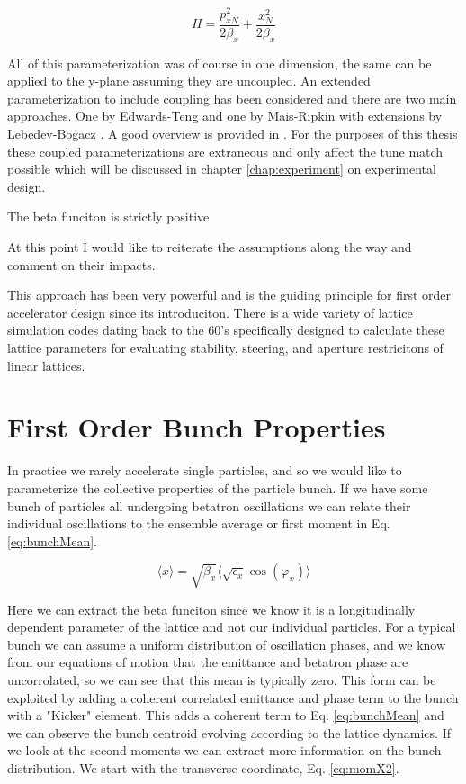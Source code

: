 \begin{equation} \label{eq:csNormHam}
	H = \frac{p_{xN}^2}{2\beta_x} + \frac{x_{N}^2}{2\beta_x}
\end{equation}

All of this parameterization was of course in one dimension, the same can be applied to the y-plane assuming they are uncoupled. An extended parameterization to include coupling has been considered and there are two main approaches. One by Edwards-Teng \cite{edwards-teng} and one by Mais-Ripkin \cite{mais-ripkin} with extensions by Lebedev-Bogacz \cite{lebedev-bogacz}. A good overview is provided in \cite{vanwelde}. For the purposes of this thesis these coupled parameterizations are extraneous and only affect the tune match possible which will be discussed in chapter \ref{chap:experiment} on experimental design.

The beta funciton is strictly positive

At this point I would like to reiterate the assumptions along the way and comment on their impacts.

This approach has been very powerful and is the guiding principle for first order accelerator design since its introduciton. There is a wide variety of lattice simulation codes dating back to the 60's specifically designed to calculate these lattice parameters for evaluating stability, steering, and aperture restricitons of linear lattices.

\section{First Order Bunch Properties} \label{sec:bunchEmit}
In practice we rarely accelerate single particles, and so we would like to parameterize the collective properties of the particle bunch. If we have some bunch of particles all undergoing betatron oscillations we can relate their individual oscillations to the ensemble average or first moment in Eq. \ref{eq:bunchMean}.

\begin{equation} \label{eq:bunchMean}
	\langle x \rangle  = \sqrt{\beta_x} \langle \sqrt{\epsilon_x} \cos{(\varphi_x)}\rangle 
\end{equation}

Here we can extract the beta funciton since we know it is a longitudinally dependent parameter of the lattice and not our individual particles. For a typical bunch we can assume a uniform distribution of oscillation phases, and we know from our equations of motion that the emittance and betatron phase are uncorrolated, so we can see that this mean is typically zero. This form can be exploited by adding a coherent correlated emittance and phase term to the bunch with a "Kicker" element. This adds a coherent term to Eq. \ref{eq:bunchMean} and we can observe the bunch centroid evolving according to the lattice dynamics. If we look at the second moments we can extract more information on the bunch distribution. We start with the transverse coordinate, Eq. \ref{eq:momX2}.

